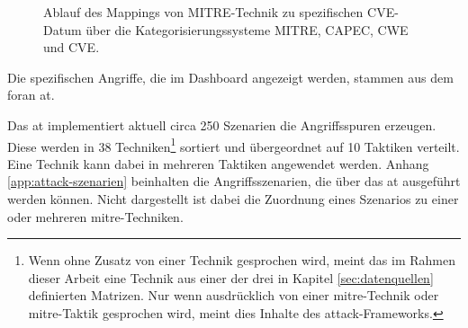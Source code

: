 %
\begin{figure}[H]
    \centering
    \caption{Ablauf des Mappings von MITRE-Technik zu spezifischen CVE-Datum über die Kategorisierungssysteme MITRE, CAPEC, CWE und CVE.}
    \label{fig:mitre_mapping}
\end{figure}

Die spezifischen Angriffe, die im Dashboard angezeigt werden, stammen aus dem \gls{foran} \gls{at}. 

\par Das \gls{at} implementiert aktuell circa 250 Szenarien die Angriffsspuren erzeugen. Diese werden in 38 Techniken\footnote{Wenn ohne Zusatz von einer Technik gesprochen wird, meint das im Rahmen dieser Arbeit eine Technik aus einer der drei in Kapitel \ref{sec:datenquellen} definierten Matrizen. Nur wenn ausdrücklich von einer \gls{mitre}-Technik oder \gls{mitre}-Taktik gesprochen wird, meint dies Inhalte des \gls{attack}-Frameworks.} sortiert und übergeordnet auf 10 Taktiken verteilt. Eine Technik kann dabei in mehreren Taktiken angewendet werden. Anhang \ref{app:attack-szenarien} beinhalten die Angriffsszenarien, die über das \gls{at} ausgeführt werden können.
Nicht dargestellt ist dabei die Zuordnung eines Szenarios zu einer oder mehreren \gls{mitre}-Techniken.


